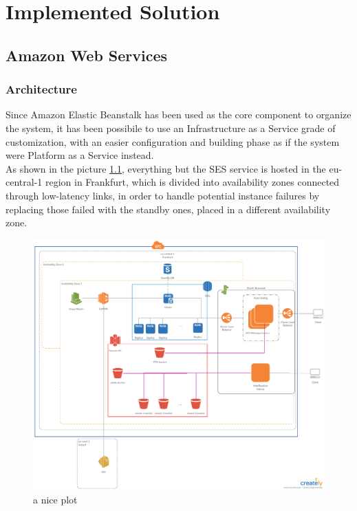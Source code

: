 \chapter{Implemented Solution}
\section{Amazon Web Services}

\subsection{Architecture}
Since Amazon Elastic Beanstalk has been used as the core component to organize the system, it has been possibile to use an Infrastructure as a Service grade of customization, with an easier configuration and building phase as if the system were Platform as a Service instead.\\
As shown in the picture \ref{fig:architecture}, everything but the SES service is hosted in the eu-central-1 region in Frankfurt, which is divided into availability zones connected through low-latency links, in order to handle potential instance failures by replacing those failed with the standby ones, placed in a different availability zone.\\

\begin{figure}[h]
    \includegraphics[width=\textwidth]{architecture}
    \caption{a nice plot}
    \label{fig:architecture}
\end{figure}
